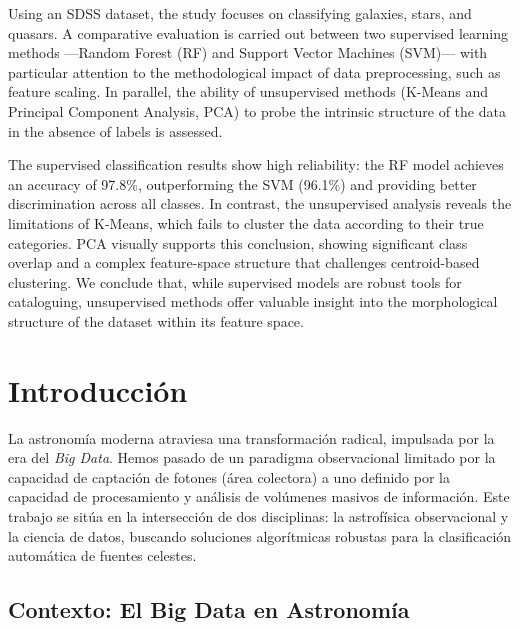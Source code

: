 \documentclass[12pt, a4paper]{report}
\begin{document}
Using an SDSS dataset, the study focuses on classifying galaxies, stars, and quasars. A comparative evaluation is carried out between two supervised learning methods —Random Forest (RF) and Support Vector Machines (SVM)— with particular attention to the methodological impact of data preprocessing, such as feature scaling. In parallel, the ability of unsupervised methods (K-Means and Principal Component Analysis, PCA) to probe the intrinsic structure of the data in the absence of labels is assessed.

The supervised classification results show high reliability: the RF model achieves an accuracy of 97.8\%, outperforming the SVM (96.1\%) and providing better discrimination across all classes. In contrast, the unsupervised analysis reveals the limitations of K-Means, which fails to cluster the data according to their true categories. PCA visually supports this conclusion, showing significant class overlap and a complex feature-space structure that challenges centroid-based clustering. We conclude that, while supervised models are robust tools for cataloguing, unsupervised methods offer valuable insight into the morphological structure of the dataset within its feature space.

\clearpage

\tableofcontents
\clearpage



\chapter{Introducción}
\label{chap:intro}

La astronomía moderna atraviesa una transformación radical, impulsada por la era del \textit{Big Data}. Hemos pasado de un paradigma observacional limitado por la capacidad de captación de fotones (área colectora) a uno definido por la capacidad de procesamiento y análisis de volúmenes masivos de información. Este trabajo se sitúa en la intersección de dos disciplinas: la astrofísica observacional y la ciencia de datos, buscando soluciones algorítmicas robustas para la clasificación automática de fuentes celestes.

\section{Contexto: El Big Data en Astronomía}
\end{document}
